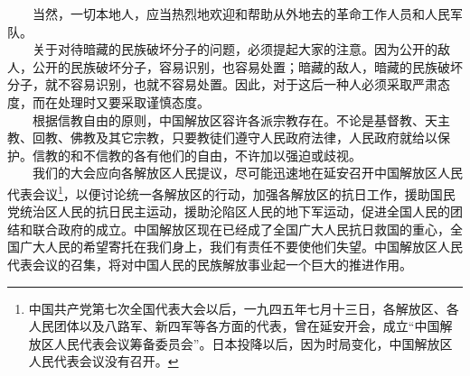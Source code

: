 \documentclass[cn,11pt,chinese]{elegantbook}
\begin{document}
　　当然，一切本地人，应当热烈地欢迎和帮助从外地去的革命工作人员和人民军队。\\
　　关于对待暗藏的民族破坏分子的问题，必须提起大家的注意。因为公开的敌人，公开的民族破坏分子，容易识别，也容易处置；暗藏的敌人，暗藏的民族破坏分子，就不容易识别，也就不容易处置。因此，对于这后一种人必须采取严肃态度，而在处理时又要采取谨慎态度。\\
　　根据信教自由的原则，中国解放区容许各派宗教存在。不论是基督教、天主教、回教、佛教及其它宗教，只要教徒们遵守人民政府法律，人民政府就给以保护。信教的和不信教的各有他们的自由，不许加以强迫或歧视。\\
　　我们的大会应向各解放区人民提议，尽可能迅速地在延安召开中国解放区人民代表会议\footnote[29]{ 中国共产党第七次全国代表大会以后，一九四五年七月十三日，各解放区、各人民团体以及八路军、新四军等各方面的代表，曾在延安开会，成立“中国解放区人民代表会议筹备委员会”。日本投降以后，因为时局变化，中国解放区人民代表会议没有召开。}，以便讨论统一各解放区的行动，加强各解放区的抗日工作，援助国民党统治区人民的抗日民主运动，援助沦陷区人民的地下军运动，促进全国人民的团结和联合政府的成立。中国解放区现在已经成了全国广大人民抗日救国的重心，全国广大人民的希望寄托在我们身上，我们有责任不要使他们失望。中国解放区人民代表会议的召集，将对中国人民的民族解放事业起一个巨大的推进作用。\\
\end{document}
